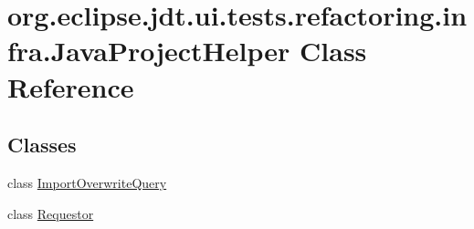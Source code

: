 \hypertarget{classorg_1_1eclipse_1_1jdt_1_1ui_1_1tests_1_1refactoring_1_1infra_1_1JavaProjectHelper}{
\section{org.eclipse.jdt.ui.tests.refactoring.infra.JavaProjectHelper Class Reference}
\label{classorg_1_1eclipse_1_1jdt_1_1ui_1_1tests_1_1refactoring_1_1infra_1_1JavaProjectHelper}
}
\subsection*{Classes}
\begin{DoxyCompactItemize}
\item 
class \hyperlink{classorg_1_1eclipse_1_1jdt_1_1ui_1_1tests_1_1refactoring_1_1infra_1_1JavaProjectHelper_1_1ImportOverwriteQuery}{ImportOverwriteQuery}
\item 
class \hyperlink{classorg_1_1eclipse_1_1jdt_1_1ui_1_1tests_1_1refactoring_1_1infra_1_1JavaProjectHelper_1_1Requestor}{Requestor}
\end{DoxyCompactItemize}
